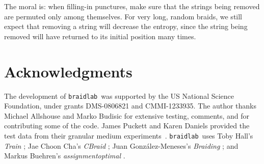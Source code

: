 \documentclass[12pt]{article}
\newcommand{\braidlab}{\texttt{braidlab}}%
\begin{document}
The moral is: when filling-in punctures, make sure that the strings being
removed are permuted only among themselves.  For very long, random braids, we
still expect that removing a string will decrease the entropy, since the
string being removed will have returned to its initial position many times.


\section*{Acknowledgments}

The development of \braidlab\ was supported by the US National Science
Foundation, under grants DMS-0806821 and CMMI-1233935.  The author thanks
Michael Allshouse and Marko Budisic for extensive testing, comments, and for
contributing some of the code.  James Puckett and Karen Daniels provided the
test data from their granular medium experiments~\citep{Puckett2012}.
\braidlab\ uses Toby Hall's \emph{Train} \citep{HallTrain}; Jae Choon Cha's
\emph{CBraid} \citep{CBraid}; Juan Gonz\'{a}lez-Meneses's \emph{Braiding}
\citep{Braiding}; and Markus Buehren's \emph{assignmentoptimal}
\citep{assignmentoptimal}.





% 
\end{document}
